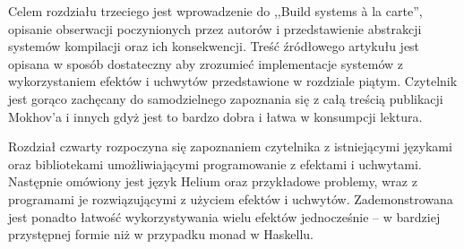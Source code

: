 Celem rozdziału trzeciego jest wprowadzenie do ,,Build systems {\`a} la carte'', opisanie obserwacji poczynionych przez autorów i przedstawienie abstrakcji systemów kompilacji oraz ich konsekwencji. Treść źródłowego artykułu jest opisana w sposób dostateczny aby zrozumieć implementacje systemów z wykorzystaniem efektów i uchwytów przedstawione w rozdziale piątym. Czytelnik jest gorąco zachęcany do samodzielnego zapoznania się z całą treścią publikacji Mokhov'a i innych gdyż jest to bardzo dobra i łatwa w konsumpcji lektura.

Rozdział czwarty rozpoczyna się zapoznaniem czytelnika z istniejącymi językami oraz bibliotekami umożliwiającymi programowanie z efektami i uchwytami. Następnie omówiony jest język Helium oraz przykładowe problemy, wraz z programami je rozwiązującymi z użyciem efektów i uchwytów. Zademonstrowana jest ponadto łatwość wykorzystywania wielu efektów jednocześnie -- w bardziej przystępnej formie niż w przypadku monad w Haskellu.
